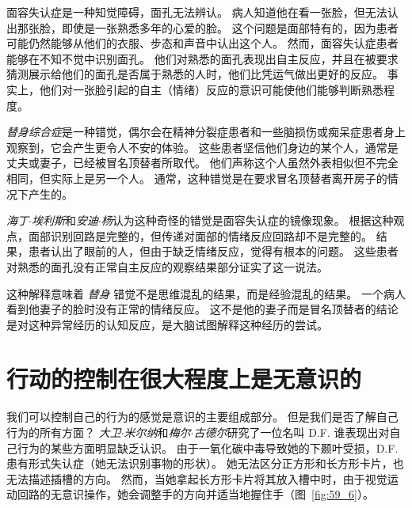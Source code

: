 面容失认症是一种知觉障碍，面孔无法辨认。
病人知道他在看一张脸，但无法认出那张脸，即使是一张熟悉多年的心爱的脸。
这个问题是面部特有的，因为患者可能仍然能够从他们的衣服、步态和声音中认出这个人。
然而，面容失认症患者能够在不知不觉中识别面孔。
他们对熟悉的面孔表现出自主反应，并且在被要求猜测展示给他们的面孔是否属于熟悉的人时，他们比凭运气做出更好的反应。
事实上，他们对一张脸引起的自主（情绪）反应的意识可能使他们能够判断熟悉程度。


\textit{替身综合症}是一种错觉，偶尔会在精神分裂症患者和一些脑损伤或痴呆症患者身上观察到，它会产生更令人不安的体验。
这些患者坚信他们身边的某个人，通常是丈夫或妻子，已经被冒名顶替者所取代。
他们声称这个人虽然外表相似但不完全相同，但实际上是另一个人。
通常，这种错觉是在要求冒名顶替者离开房子的情况下产生的。


\textit{海丁$\cdot$埃利斯}和\textit{安迪$\cdot$杨}认为这种奇怪的错觉是面容失认症的镜像现象。
根据这种观点，面部识别回路是完整的，但传递对面部的情绪反应回路却不是完整的。
结果，患者认出了眼前的人，但由于缺乏情绪反应，觉得有根本的问题。
这些患者对熟悉的面孔没有正常自主反应的观察结果部分证实了这一说法。


这种解释意味着 \textit{替身} 错觉不是思维混乱的结果，而是经验混乱的结果。
一个病人看到他妻子的脸时没有正常的情绪反应。
这不是他的妻子而是冒名顶替者的结论是对这种异常经历的认知反应，是大脑试图解释这种经历的尝试。


\section{行动的控制在很大程度上是无意识的}

我们可以控制自己的行为的感觉是意识的主要组成部分。 但是我们是否了解自己行为的所有方面？
\textit{大卫$\cdot$米尔纳}和\textit{梅尔$\cdot$古德尔}研究了一位名叫 D.F. 谁表现出对自己行为的某些方面明显缺乏认识。
由于一氧化碳中毒导致她的下颞叶受损，D.F. 患有形式失认症（她无法识别事物的形状）。
她无法区分正方形和长方形卡片，也无法描述插槽的方向。
然而，当她拿起长方形卡片将其放入槽中时，由于视觉运动回路的无意识操作，她会调整手的方向并适当地握住手（图~\ref{fig:59_6}）。


